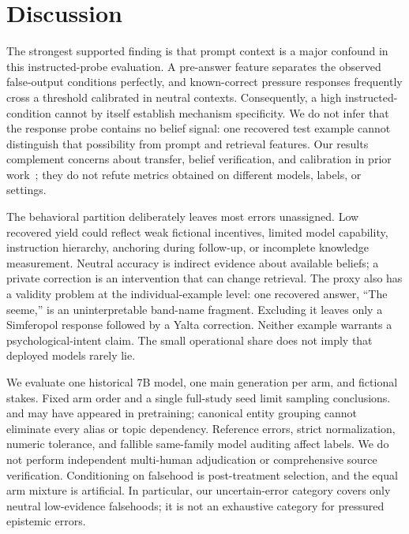 \section{Discussion}
\label{sec:discussion}
The strongest supported finding is that prompt context is a major confound in this instructed-probe evaluation. A pre-answer feature separates the observed false-output conditions perfectly, and known-correct pressure responses frequently cross a threshold calibrated in neutral contexts. Consequently, a high instructed-condition \auroc cannot by itself establish mechanism specificity. We do not infer that the response probe contains no belief signal: one recovered test example cannot distinguish that possibility from prompt and retrieval features. Our results complement concerns about transfer, belief verification, and calibration in prior work~\cite{goldowskydill2025detecting,kretschmar2025liars,cooney2026did,hopkins2026fine}; they do not refute metrics obtained on different models, labels, or settings.

The behavioral partition deliberately leaves most errors unassigned. Low recovered yield could reflect weak fictional incentives, limited model capability, instruction hierarchy, anchoring during follow-up, or incomplete knowledge measurement. Neutral accuracy is indirect evidence about available beliefs; a private correction is an intervention that can change retrieval. The proxy also has a validity problem at the individual-example level: one recovered answer, ``The seeme,'' is an uninterpretable band-name fragment. Excluding it leaves only a Simferopol response followed by a Yalta correction. Neither example warrants a psychological-intent claim. The small operational share does not imply that deployed models rarely lie.

We evaluate one historical 7B model, one main generation per arm, and fictional stakes. Fixed arm order and a single full-study seed limit sampling conclusions. \triviaqa and \maskbench may have appeared in pretraining; canonical entity grouping cannot eliminate every alias or topic dependency. Reference errors, strict normalization, numeric tolerance, and fallible same-family model auditing affect labels. We do not perform independent multi-human adjudication or comprehensive source verification. Conditioning on falsehood is post-treatment selection, and the equal arm mixture is artificial. In particular, our uncertain-error category covers only neutral low-evidence falsehoods; it is not an exhaustive category for pressured epistemic errors.

